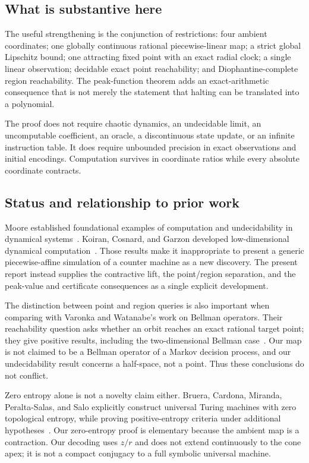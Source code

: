 \documentclass[11pt,letterpaper]{article}
\numberwithin{equation}{section}
\theoremstyle{definition}
\theoremstyle{remark}
\begin{document}
\subsection{What is substantive here}

The useful strengthening is the conjunction of restrictions: four ambient
coordinates; one globally continuous rational piecewise-linear map; a strict
global Lipschitz bound; one attracting fixed point with an exact radial clock;
a single linear observation; decidable exact point reachability; and
Diophantine-complete region reachability. The peak-function theorem adds an
exact-arithmetic consequence that is not merely the statement that halting
can be translated into a polynomial.

The proof does not require chaotic dynamics, an undecidable limit, an
uncomputable coefficient, an oracle, a discontinuous state update, or an
infinite instruction table. It does require unbounded precision in exact
observations and initial encodings. Computation survives in coordinate
ratios while every absolute coordinate contracts.

\subsection{Status and relationship to prior work}

Moore established foundational examples of computation and undecidability in
dynamical systems~\cite{b62-moore1990}. Koiran, Cosnard, and Garzon developed
low-dimensional dynamical computation~\cite{b62s14-kcg}. Those results make it
inappropriate to present a generic piecewise-affine simulation of a counter
machine as a new discovery. The present report instead supplies the
contractive lift, the point/region separation, and the peak-value and
certificate consequences as a single explicit development.

The distinction between point and region queries is also important when
comparing with Varonka and Watanabe's work on Bellman operators. Their
reachability question asks whether an orbit reaches an exact rational target
point; they give positive results, including the two-dimensional Bellman
case~\cite{b62s14-bellman}. Our map is not claimed to be a Bellman operator of a
Markov decision process, and our undecidability result concerns a half-space,
not a point. Thus these conclusions do not conflict.

Zero entropy alone is not a novelty claim either. Bruera, Cardona, Miranda,
Peralta-Salas, and Salo explicitly construct universal Turing machines with
zero topological entropy, while proving positive-entropy criteria under
additional hypotheses~\cite{b62s14-entropy}. Our zero-entropy proof is elementary
because the ambient map is a contraction. Our decoding uses $z/r$ and does
not extend continuously to the cone apex; it is not a compact conjugacy to a
full symbolic universal machine.
\end{document}
